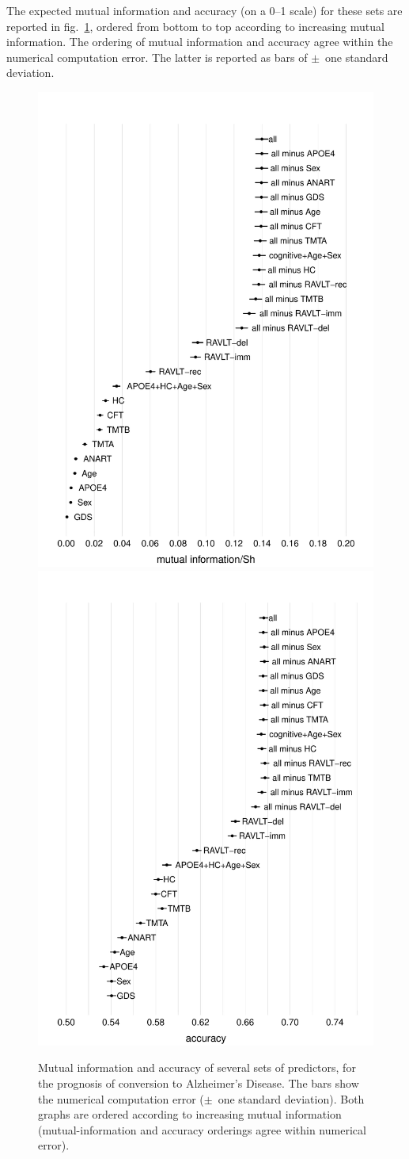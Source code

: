 \documentclass[utf8]{FrontiersinHarvard} %
\newcommand*{\fig}{fig.}%
\renewcommand*{\|}[1][]{\nonscript\:#1\vert\nonscript\:\mathopen{}}
\newcommand*{\ad}{Alzheimer's Disease}
\begin{document}
The expected mutual information and accuracy (on a 0--1 scale) for these sets are reported in \fig~\ref{fig:mutual_info}, ordered from bottom to top according to increasing mutual information. The ordering of mutual information and accuracy agree within the numerical computation error. The latter is reported as bars of $\pm$~one standard deviation.
\begin{figure}[!t]%
  \centering%
  \includegraphics[width=0.494\linewidth]{plotMI.pdf}\hfill%
  \includegraphics[width=0.494\linewidth]{plotAcc.pdf}%
  \caption{Mutual information and accuracy of several sets of predictors, for the prognosis of conversion to \ad. The bars show the numerical computation error ($\pm$~one standard deviation). Both graphs are ordered according to increasing mutual information (mutual-information and accuracy orderings agree within numerical error).}\label{fig:mutual_info}
\end{figure}%
\end{document}
